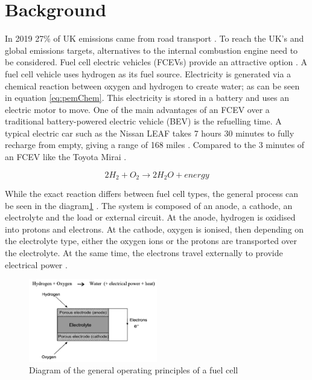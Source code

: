 \documentclass[a4paper,11pt]{article}
\begin{document}
\section{Background}


In 2019 27\% of UK emissions came from road transport \cite{waite2019emissions}. To reach the UK's and global emissions targets, alternatives to the internal combustion engine need to be considered. Fuel cell electric vehicles (FCEVs) provide an attractive option \cite{yoshida2015toyota}. A fuel cell vehicle uses hydrogen as its fuel source. Electricity is generated via a chemical reaction between oxygen and hydrogen to create water; as can be seen in equation \ref{eq:pemChem}. This electricity is stored in a battery and uses an electric motor to move. One of the main advantages of an FCEV over a traditional battery-powered electric vehicle (BEV) is the refuelling time. A typical electric car such as the Nissan LEAF takes 7 hours 30 minutes to fully recharge from empty, giving a range of 168 miles \cite{Nissan2022Elec}. Compared to the 3 minutes of an FCEV like the Toyota Mirai \cite{yoshida2015toyota}. 

\begin{equation} \label{eq:pemChem}
    2H_{2} + O_2 \rightarrow 2H_{2}O + energy
\end{equation}

While the exact reaction differs between fuel cell types, the general process can be seen in the diagram\ref{fig:fuelCellBasic} \cite{Mark2003SolidOxide}. The system is composed of an anode, a cathode, an electrolyte and the load or external circuit. At the anode, hydrogen is oxidised into protons and electrons. At the cathode, oxygen is ionised, then depending on the electrolyte type, either the oxygen ions or the protons are transported over the electrolyte. At the same time, the electrons travel externally to provide electrical power \cite{Mark2003SolidOxide}.


\begin{figure}[h!]
    \includegraphics[width=0.5\textwidth]{Figures/FuelCellBasics_high res.png}
    \centering  
    \caption{Diagram of the general operating principles of a fuel cell \cite{Mark2003SolidOxide}}
    \label{fig:fuelCellBasic}
    \centering  
\end{figure}
\end{document}
